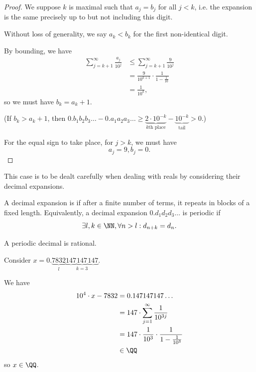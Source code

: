\begin{proof}
    We suppose \(k\) is maximal such that \(a_j = b_j\) for all \(j < k\), i.e. the expansion is the same precisely up to but not including this digit.

    Without loss of generality, we say \(a_k < b_k\) for the first non-identical digit.

    By bounding, we have
    \begin{align*}
        \sum_{j = k + 1}^{\infty} \frac{a_j}{10^j} &\leq \sum_{j = k + 1}^{\infty} \frac{9}{10^j} \\
        &= \frac{9}{10^{k + 1}} \cdot \frac{1}{1 - \frac{1}{10}} \\
        &= \frac{1}{10^k},
    \end{align*}
    so we must have \(b_k = a_k + 1\).

    (If \(b_k > a_k + 1\), then \(0.b_1 b_2 b_3 \ldots - 0.a_1 a_2 a_3 \ldots \geq \underbrace{2\cdot 10^{-k}}_{k\text{th place}} - \underbrace{10^{-k}}_{\text{tail}} > 0\).)

    For the equal sign to take place, for \(j > k\), we must have
    \[
        a_j = 9, b_j = 0.
    \]
\end{proof}

This case is to be dealt carefully when dealing with reals by considering their decimal expansions.

\begin{definition}
    A decimal expansion is  if after a finite number of terms, it repeats in blocks of a fixed length. Equivalently, a decimal expansion \(0.d_1 d_2 d_3 \ldots\) is periodic if
    \[
        \exists l, k \in \NN, \forall n > l: d_{n + k} = d_n.
    \]
\end{definition}

\begin{proposition}
    A periodic decimal is rational.
\end{proposition}

\begin{example}
    Consider \(x = 0.\underbrace{7832}_{l}\underbrace{147}\underbrace{147}_{k = 3}\underbrace{147}\).

    We have
    \begin{align*}
        10^4 \cdot x - 7832 &= 0.147 147 147 \ldots \\
        &= 147 \cdot \sum_{j = 1}^{\infty} \frac{1}{10^{3j}} \\
        &= 147 \cdot \frac{1}{10^3} \cdot \frac{1}{1 - \frac{1}{10^3}} \\
        &\in \QQ
    \end{align*}
    so \(x \in \QQ\).
\end{example}

